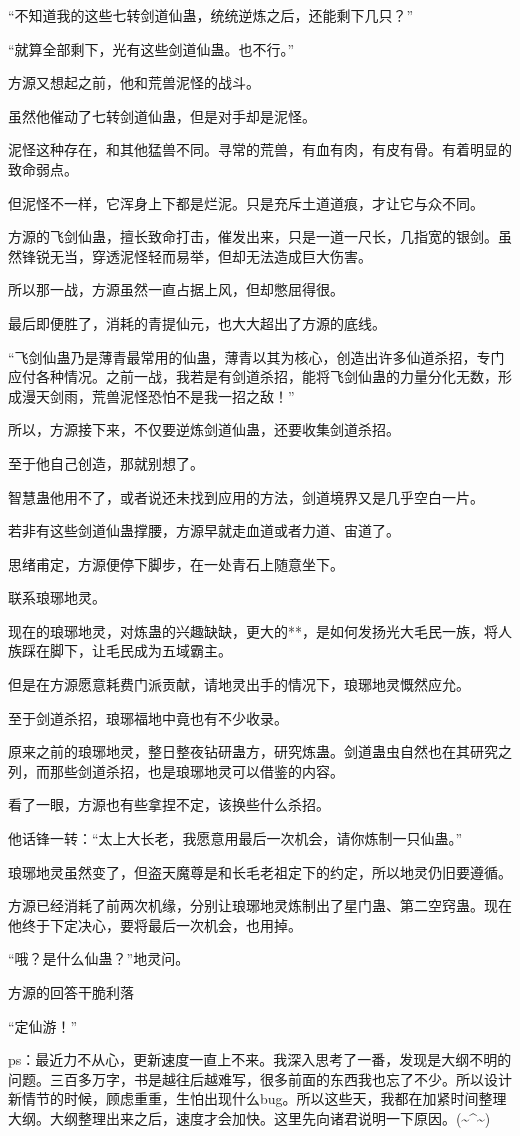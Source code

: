 \begin{this_body}
“不知道我的这些七转剑道仙蛊，统统逆炼之后，还能剩下几只？”

“就算全部剩下，光有这些剑道仙蛊。也不行。”

方源又想起之前，他和荒兽泥怪的战斗。

虽然他催动了七转剑道仙蛊，但是对手却是泥怪。

泥怪这种存在，和其他猛兽不同。寻常的荒兽，有血有肉，有皮有骨。有着明显的致命弱点。

但泥怪不一样，它浑身上下都是烂泥。只是充斥土道道痕，才让它与众不同。

方源的飞剑仙蛊，擅长致命打击，催发出来，只是一道一尺长，几指宽的银剑。虽然锋锐无当，穿透泥怪轻而易举，但却无法造成巨大伤害。

所以那一战，方源虽然一直占据上风，但却憋屈得很。

最后即便胜了，消耗的青提仙元，也大大超出了方源的底线。

“飞剑仙蛊乃是薄青最常用的仙蛊，薄青以其为核心，创造出许多仙道杀招，专门应付各种情况。之前一战，我若是有剑道杀招，能将飞剑仙蛊的力量分化无数，形成漫天剑雨，荒兽泥怪恐怕不是我一招之敌！”

所以，方源接下来，不仅要逆炼剑道仙蛊，还要收集剑道杀招。

至于他自己创造，那就别想了。

智慧蛊他用不了，或者说还未找到应用的方法，剑道境界又是几乎空白一片。

若非有这些剑道仙蛊撑腰，方源早就走血道或者力道、宙道了。

思绪甫定，方源便停下脚步，在一处青石上随意坐下。

联系琅琊地灵。

现在的琅琊地灵，对炼蛊的兴趣缺缺，更大的**，是如何发扬光大毛民一族，将人族踩在脚下，让毛民成为五域霸主。

但是在方源愿意耗费门派贡献，请地灵出手的情况下，琅琊地灵慨然应允。

至于剑道杀招，琅琊福地中竟也有不少收录。

原来之前的琅琊地灵，整日整夜钻研蛊方，研究炼蛊。剑道蛊虫自然也在其研究之列，而那些剑道杀招，也是琅琊地灵可以借鉴的内容。

看了一眼，方源也有些拿捏不定，该换些什么杀招。

他话锋一转：“太上大长老，我愿意用最后一次机会，请你炼制一只仙蛊。”

琅琊地灵虽然变了，但盗天魔尊是和长毛老祖定下的约定，所以地灵仍旧要遵循。

方源已经消耗了前两次机缘，分别让琅琊地灵炼制出了星门蛊、第二空窍蛊。现在他终于下定决心，要将最后一次机会，也用掉。

“哦？是什么仙蛊？”地灵问。

方源的回答干脆利落

“定仙游！”

ps：最近力不从心，更新速度一直上不来。我深入思考了一番，发现是大纲不明的问题。三百多万字，书是越往后越难写，很多前面的东西我也忘了不少。所以设计新情节的时候，顾虑重重，生怕出现什么bug。所以这些天，我都在加紧时间整理大纲。大纲整理出来之后，速度才会加快。这里先向诸君说明一下原因。(\~{}\^{}\~{})

\end{this_body}

